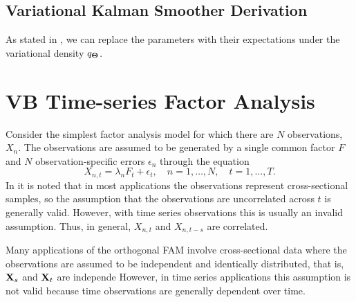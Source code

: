 \subsection{Variational Kalman Smoother Derivation}
As stated in \cite{bealVariationalAlgorithmsApproximate}, we can replace the parameters with their expectations under the variational density $q_{ \bf \Theta }$. 

\clearpage
\section{VB Time-series Factor Analysis}
Consider the simplest factor analysis model for which there are $N$ observations, $X_n$. The observations are assumed to be generated by a single common factor $F$ and $N$ observation-specific errors $\epsilon_n$ through the equation
\begin{equation}
	X_{n, t} = \lambda_n F_t + \epsilon_t, \quad n = 1, \ldots, N, \quad t = 1, \ldots, T.
\end{equation}
In \cite{gewekeDynamicFactorAnalysis1977} it is noted that in most applications the observations represent cross-sectional samples, so the assumption that the observations are uncorrelated across $t$ is generally valid. However, with time series observations this is usually an invalid assumption. Thus, in general,  $X_{n, t}$ and $X_{n, t-s}$ are correlated. 

Many applications of the orthogonal FAM involve cross-sectional data where the observations are assumed to be independent and identically distributed, that is, ${\bf X}_s$ and ${\bf X}_t$ are independe However, in time series applications this assumption is not valid because time observations are generally dependent over time. 

